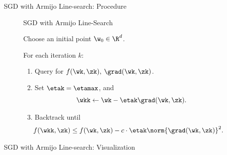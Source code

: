 \documentclass[mathserif,notheorems, hyperref={colorlinks, citecolor=blue, urlcolor=blue, linkcolor=blue}]{beamer}
\begin{document}
    \begin{frame}{SGD with Armijo Line-search: Procedure}
        
        \begin{figure}[t]
            \begin{procedure}{SGD with Armijo Line-Search}
            \item Choose an initial point \( \w_0 \in \R^d \).
                \vspace{2ex}
            \item For each iteration \( k \):
                \begin{enumerate}
                    \item Query \oracle{} for \( f(\wk, \zk), \: \grad(\wk, \zk) \). 
                        \vspace{1ex}
                    \item Set \( \etak =  \etamax \), and \[ \wkk \gets \wk - \etak \grad(\wk, \zk). \]
                    \item Backtrack until
                        \[  \hspace{-1em} f(\wkk, \zk) \leq f(\wk, \zk) - c \cdot \etak \norm{\grad(\wk, \zk)}^2. \]
                \end{enumerate}
            \end{procedure}
        \end{figure}

    \end{frame}

    \begin{frame}{SGD with Armijo Line-search: Visualization}
        \begin{figure}[]
            \centering
            
        \end{figure} 
    \end{frame}
\end{document}
